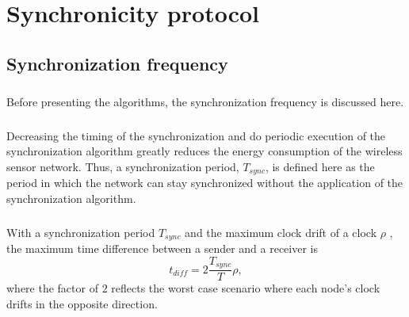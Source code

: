 \documentclass[a4paper,10pt]{report}
\begin{document}
\chapter{\textbf{Synchronicity protocol}}
\section{\textbf{Synchronization frequency}}\paragraph*{}
Before presenting the algorithms, the synchronization frequency is discussed here. 
\paragraph*{} Decreasing the timing of the synchronization and do periodic execution of the synchronization algorithm greatly reduces
the energy consumption of the wireless sensor network. Thus, a synchronization period, $T_{sync}$, is defined here as the period in which the network can stay synchronized without the application of the synchronization algorithm.
\paragraph*{}
With a synchronization period $T_{sync}$ and the maximum clock drift of a clock $\rho$ , the maximum time difference between a sender and a receiver is
\begin{equation}
t_{diff} = 2\frac{T_{sync}}{T}\rho ,
\end{equation}
where the factor of $2$ reflects the worst case scenario where each node's clock drifts in the opposite direction.
\end{document}
